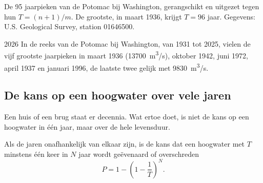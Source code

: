 \begin{omfigure}

{\small De \num{95} jaarpieken van de Potomac bij Washington, gerangschikt en
uitgezet tegen hun  $T = (n+1)/m$. De grootste, in maart
1936, krijgt $T = 96$ jaar. Gegevens: U.S. Geological Survey, station 01646500.}
\end{omfigure}

\begin{dated}{2026}
In de reeks van de Potomac bij Washington, van 1931 tot 2025, vielen de vijf
grootste jaarpieken in maart 1936 (\qty{13700}{m^3/s}), oktober 1942,
juni 1972, april 1937 en januari 1996, de laatste twee gelijk met
\qty{9830}{m^3/s}.
\end{dated}

\subsection*{De kans op een hoogwater over vele jaren}

Een huis of een brug staat er decennia. Wat ertoe doet, is niet de kans op een
hoogwater in één jaar, maar over de hele levensduur.

\begin{proposition}\label{prop:g10:drainage-basins:chance}
Als de jaren onafhankelijk van elkaar zijn, is de kans dat een hoogwater met
 $T$ minstens één keer in $N$ jaar wordt geëvenaard of overschreden
\[
P = 1 - \left(1 - \frac{1}{T}\right)^{N}.
\]
\end{proposition}

